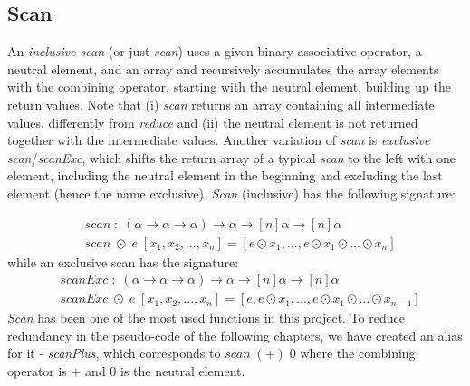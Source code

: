 \subsection{Scan}
An \textit{inclusive scan} (or just \textit{scan}) uses a given binary-associative operator, a neutral element, and an array and recursively accumulates the array elements with the combining operator, starting with the neutral element, building up the return values. Note that (i) \textit{scan} returns an array containing all intermediate values, differently from \textit{reduce} and (ii) the neutral element is not returned together with the intermediate values. Another variation of \textit{scan} is \textit{exclusive scan}/\textit{scanExc}, which shifts the return array of a typical \textit{scan} to the left with one element, including the neutral element in the beginning and excluding the last element (hence the name exclusive). \textit{Scan} (inclusive) has the following signature:

\begin{align}
  \nonumber&\mathit{scan}\;:\;(\alpha\rightarrow\alpha\rightarrow\alpha)\rightarrow\alpha\rightarrow[n]\alpha\rightarrow[n]\alpha\\
  \nonumber&\mathit{scan}\;\odot\;e\;[x_1,x_2,...,x_n]=[e\odot x_1,...,e\odot x_1\odot...\odot x_n]
\end{align}
while an exclusive scan has the signature:
\begin{align}
  \nonumber&\mathit{scanExc}\;:\;(\alpha\rightarrow\alpha\rightarrow\alpha)\rightarrow\alpha\rightarrow[n]\alpha\rightarrow[n]\alpha\\
  \nonumber&\mathit{scanExc}\;\odot\;e\;[x_1,x_2,...,x_n]=[e,e\odot x_1,...,e\odot x_1\odot...\odot x_{n-1}]
\end{align}
\textit{Scan} has been one of the most used functions in this project. To reduce redundancy in the pseudo-code of the following chapters, we have created an alias for it - \textit{scanPlus}, which corresponds to $\mathit{scan}\;(+)\;0$ where the combining operator is $+$ and $0$ is the neutral element.

